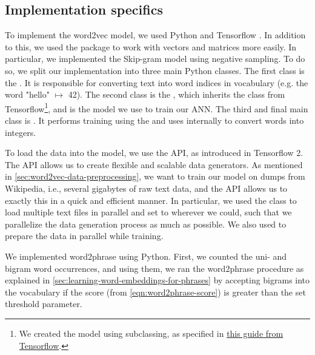 \subsection{Implementation specifics}
To implement the word2vec model, we used Python and Tensorflow \cite{tensorflow2015-whitepaper}. In addition to this, we used the  \cite{2020NumPy-Array} package to work with vectors and matrices more easily. In particular, we implemented the Skip-gram model using negative sampling. To do so, we split our implementation into three main Python classes. The first class is the . It is responsible for converting text into word indices in vocabulary (e.g. the word "hello" $\mapsto$ 42). The second class is the , which inherits the  class from Tensorflow\footnote{We created the model using subclassing, as specified in \href{https://www.tensorflow.org/guide/keras/custom_layers_and_models}{this guide from Tensorflow}.}, and is the model we use to train our ANN. The third and final main class is . It performs training using the  and uses  internally to convert words into integers.

To load the data into the model, we use the  API, as introduced in Tensorflow 2. The  API allows us to create flexible and scalable data generators. As mentioned in \cref{sec:word2vec-data-preprocessing}, we want to train our model on dumps from Wikipedia, i.e., several gigabytes of raw text data, and the  API allows us to exactly this in a quick and efficient manner. In particular, we used the  class to load multiple text files in parallel and set  to  wherever we could, such that we parallelize the data generation process as much as possible. We also used  to prepare the data in parallel while training.

We implemented word2phrase using Python. First, we counted the uni- and bigram word occurrences, and using them, we ran the word2phrase procedure as explained in \cref{sec:learning-word-embeddings-for-phrases} by accepting bigrams into the vocabulary if the score (from \cref{eqn:word2phrase-score}) is greater than the set threshold parameter.

